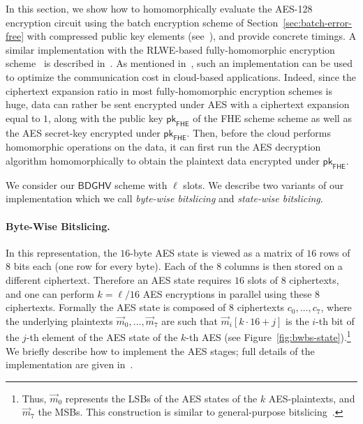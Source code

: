 \documentclass[11pt]{llncs}
\newcommand*{\pk}{\ensuremath{\mathsf{pk}}}
\newcommand*{\BDGHV}{\ensuremath{\mathsf{BDGHV}}}
\newcommand*{\FHE}{\ensuremath{\mathsf{FHE}}}
\newcommand*\bwbs{byte-wise bitslicing\xspace}
\newcommand*\swbs{state-wise bitslicing\xspace}
\begin{document}
In this section, we show how to homomorphically evaluate the AES-128
encryption circuit using the batch encryption scheme of Section~\ref{sec:batch-error-free} with compressed public key elements (see~\cite{CLT2013a}), and provide
concrete timings. A similar
implementation with
 the RLWE-based 
fully-homomorphic encryption scheme~\cite{BV2011a,BV2011b,GHS2012a} is
described in~\cite{GHS2012c}. 
As mentioned 
in~\cite{SV2011,NLV2011,GHS2012c}, such an implementation can be used to
optimize the communication cost in cloud-based
applications. Indeed, since the ciphertext expansion ratio in most
fully-homomorphic encryption schemes is huge, data can rather be sent
encrypted under AES with a ciphertext expansion equal to $1$, along
with the public key $\pk_{\FHE}$ of the FHE scheme scheme as well as
the AES secret-key 
encrypted under $\pk_{\FHE}$. Then, before the cloud performs homomorphic operations
on the data, it can first run the AES decryption algorithm
homomorphically to obtain the plaintext data encrypted under
$\pk_{\FHE}$.


We consider our $\BDGHV$ scheme with $\ell$ slots. We describe two
variants of our implementation which we call \emph{\bwbs} and
\emph{\swbs}.

\paragraph{Byte-Wise Bitslicing.} In this representation, the
$16$-byte AES state is viewed as a matrix of $16$ rows of $8$ bits
each (one row for every byte). Each of the $8$ columns is then stored on a different
ciphertext. Therefore an AES state requires $16$ slots of $8$
ciphertexts, and one can perform
$k=\ell/16$ AES encryptions in parallel using these $8$
ciphertexts. Formally the AES state is composed of $8$ ciphertexts $c_0,\ldots,c_7$, where
the underlying plaintexts $\vec m_0,\ldots,\vec m_7$ are such that
$\vec m_i[k\cdot 16+j]$ is the $i$-th bit of the $j$-th element of the AES
state of the $k$-th AES (see Figure~\ref{fig:bwbs-state}).\footnote{
Thus, $\vec m_0$ represents the LSBs
  of the AES states of the $k$ AES-plaintexts, and $\vec m_7$ the
  MSBs. This construction is similar to general-purpose
  bitslicing~\cite{Bih1997,KS2009}.} We briefly
describe how to implement the AES stages; full details 
of the implementation are given in~\cite{CLT2013a}. 
\end{document}
